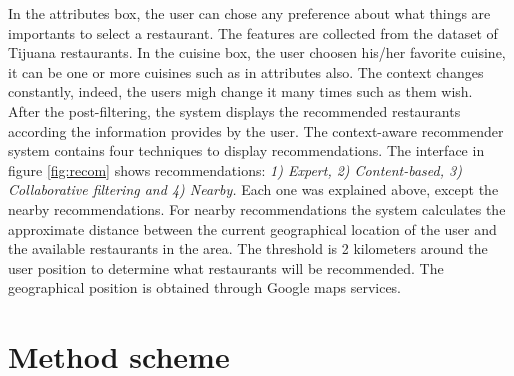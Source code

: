 In the attributes box, the user can chose any preference about what
things are importants to select a restaurant. The features are
collected from the dataset of Tijuana restaurants. In the cuisine box,
the user choosen his/her favorite cuisine, it can be one or more
cuisines such as in attributes  also.
The context changes constantly, indeed, the users migh change 
it many times such as them wish.\\ 
After the post-filtering, the system displays the  recommended
restaurants according the information provides by the user. The
context-aware recommender system contains four techniques to display
recommendations. The interface in figure \ref{fig:recom} shows
recommendations: \textit{1) Expert, 2) Content-based, 3) Collaborative
filtering and 4) Nearby.} Each one was explained above, except the
nearby recommendations. For nearby recommendations the system
calculates the approximate distance between the current geographical
location of the user and the available restaurants in the area.  The
threshold is 2 kilometers around the user position to determine what
restaurants will be recommended. The geographical position is
obtained through Google maps services.
\section{Method scheme} 

